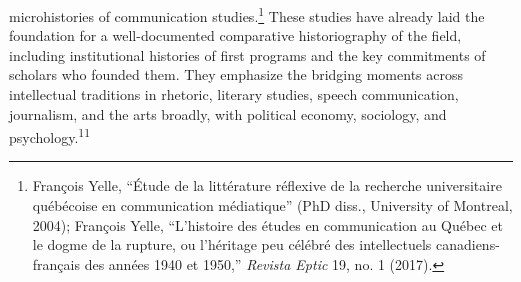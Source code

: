 \documentclass{tufte-handout}
\begin{document}
microhistories of communication studies.\footnote{François Yelle,
  ``Étude de la littérature réflexive de la recherche universitaire
  québécoise en communication médiatique'' (PhD diss., University of
  Montreal, 2004); François Yelle, ``L'histoire des études en
  communication au Québec et le dogme de la rupture, ou l'héritage peu
  célébré des intellectuels canadiens-français des années 1940 et
  1950,'' \emph{Revista Eptic} 19, no. 1 (2017).} These studies have
already laid the foundation for a well-documented comparative
historiography of the field, including institutional histories of first
programs and the key commitments of scholars who founded them. They
emphasize the bridging moments across intellectual traditions in
rhetoric, literary studies, speech communication, journalism, and the
arts broadly, with political economy, sociology, and
psychology.\textsuperscript{11}
\end{document}
